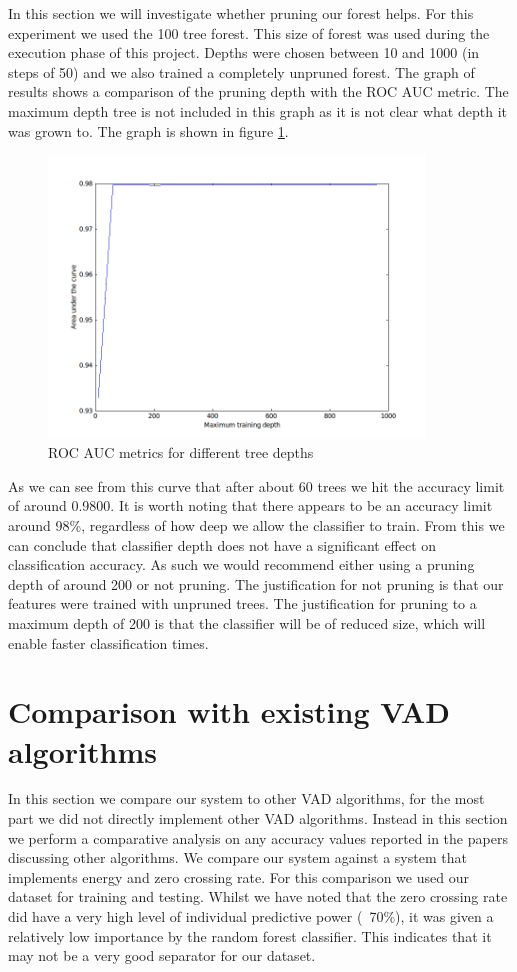 \documentclass[ %
                    author={Sam Phippen},
                supervisor={Dr. Rafal Bogacz},
                     title={Real time voice activity detectors in noisy personal computing environments},
                  subtitle={},
                    degree={MEng},
                      year={2012} ]{thesis}
\begin{document}
In this section we will investigate whether pruning our forest helps. For this
experiment we used the 100 tree forest. This size of forest was used during the
execution phase of this project. Depths were chosen between 10 and 1000 (in
steps of 50) and we also trained a completely unpruned forest. The graph of
results shows a comparison of the pruning depth with the ROC AUC metric. The
maximum depth tree is not included in this graph as it is not clear what depth
it was grown to.  The graph is shown in figure \ref{fig:roc-depths}.

\begin{figure}
    \includegraphics[width=10cm]{roc_differing_depth.png}

    \caption{ROC AUC metrics for different tree depths}
    \label{fig:roc-depths}
\end{figure}

As we can see from this curve that after about 60 trees we hit the accuracy
limit of around 0.9800. It is worth noting that there appears to be an accuracy
limit around 98\%, regardless of how deep we allow the classifier to train.
From this we can conclude that classifier depth does not have a significant
effect on classification accuracy. As such we would recommend either using a
pruning depth of around 200 or not pruning. The justification for not pruning
is that our features were trained with unpruned trees. The justification for
pruning to a maximum depth of 200 is that the classifier will be of reduced
size, which will enable faster classification times.

\section{Comparison with existing VAD algorithms}

In this section we compare our system to other VAD algorithms, for the most
part we did not directly implement other VAD algorithms. Instead in this
section we perform a comparative analysis on any accuracy values reported in
the papers discussing other algorithms. We compare our system against a system
that implements energy and zero crossing rate. For this comparison
we used our dataset for training and testing. Whilst we have noted that the
zero crossing rate did have a very high level of individual predictive power
(~70\%), it was given a relatively low importance by the random forest
classifier.  This indicates that it may not be a very good separator for our
dataset.
\end{document}
